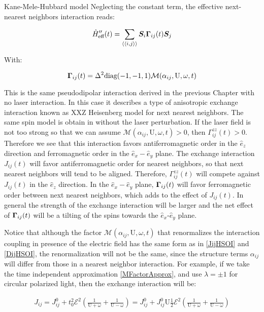 \begin{section}{Kane-Mele-Hubbard model}
Neglecting the constant term, the effective next-nearest neighbors interaction reads:

\begin{equation}
\hat{H}_{\text{eff}}''(t) = \sum_{\langle \langle i,j \rangle \rangle} \boldsymbol{S}_i \boldsymbol{\Gamma}_{ij}(t) \boldsymbol{S}_j 
\end{equation}

With:

\begin{equation}
\boldsymbol{\Gamma}_{ij}(t) = \Delta^2 \text{diag}(-1,-1,1) \mathcal{M}(\alpha_{ij}, \text{U}, \omega, t) 
\end{equation}

This is the same pseudodipolar interaction derived in the previous Chapter with no laser interaction. In this case it describes a type of anisotropic exchange interaction known as XXZ Heisenberg model for next nearest neighbors. The same spin model is obtain in \cite{Rachel2010} without the laser perturbation. If the laser field is not too strong so that we can assume $\mathcal{M}(\alpha_{ij}, \text{U}, \omega, t) > 0$, then $\Gamma^{zz}_{ij}(t) > 0$. Therefore we see that this interaction favors antiferromagnetic order in the $\hat{e}_z$ direction and ferromagnetic order in the $\hat{e}_x-\hat{e}_y$ plane. The exchange interaction $J_{ij}(t)$ will favor antiferromagnetic order for nearest neighbors, so that next nearest neighbors will tend to be aligned. Therefore, $\Gamma^{zz}_{ij}(t)$ will compete against $J_{ij}(t)$ in the $\hat{e}_z$ direction. In the $\hat{e}_x-\hat{e}_y$ plane, $\boldsymbol{\Gamma}_{ij}(t)$ will favor ferromagnetic order between next nearest neighbors, which adds to the effect of $J_{ij}(t)$. In general the strength of the exchange interaction will be larger and the net effect of $\boldsymbol{\Gamma}_{ij}(t)$ will be a tilting of the spins towards the $\hat{e}_x$-$\hat{e}_y$ plane.

Notice that although the factor $\mathcal{M}(\alpha_{ij}, \text{U}, \omega, t)$ that renormalizes the interaction coupling in presence of the electric field has the same form as in \ref{JijHSOI} and \ref{DijHSOI}, the renormalization will not be the same, since the structure terms $\alpha_{ij}$ will differ from those in a nearest neighbor interaction. For example, if we take the time independent approximation \ref{MFactorApprox}, and use $\lambda = \pm 1$ for circular polarized light, then the exchange interaction will be:

\begin{align*}
J_{ij} = J_{ij}^0 + t_0^2 \mathcal{E}^2 \left( \frac{1}{\text{U}+\omega} + \frac{1}{\text{U}-\omega} \right) = J_{ij}^0 + J_{ij}^0 \text{U}\frac{1}{2} \mathcal{E}^2 \left( \frac{1}{\text{U}+\omega} + \frac{1}{\text{U}-\omega} \right)
\end{align*}


\end{section}
